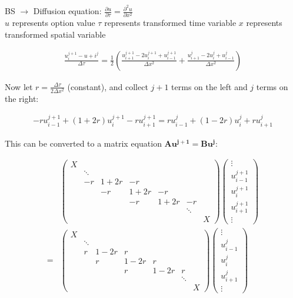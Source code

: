\documentclass[11pt]{article}
\begin{document}
BS $\to$ Diffusion equation: $\frac{\partial u}{\partial \tau}=\frac{\partial^2u}{\partial x^2}$\\
$u$ represents option value
$\tau$ represents transformed time variable
$x$ represents transformed spatial variable

\begin{align*}
    \frac{u_i^{j+1}-u+i^j}{\Delta \tau}=\frac{1}{2}\left(\frac{u_{i+1}^{j+1}-2u_i^{j+1}+u_{i-1}^{j+1}}{\Delta x^2}+\frac{u_{i+1}^{j}-2u_i^{j}+u_{i-1}^{j}}{\Delta x^2}\right)
\end{align*}

Now let $r=\frac{\Delta\tau}{2\Delta x^2}$ (constant), and collect $j+1$ terms on the left and $j$ terms on the right:

\begin{align*}
    -ru_{i-1}^{j+1}+(1+2r)u_i^{j+1}-ru_{i+1}^{j+1}=ru_{i-1}^j+(1-2r)u_i^j+ru_{i+1}^j
\end{align*}

This can be converted to a matrix equation $\mathbf{Au^{j+1}=Bu^j}$:

\begin{align*}
    &\left(\begin{array}{ccccccc}
        X & & & & & &\\
        & \ddots & & & & &\\
        & -r & 1+2r & -r & & &\\
        & & -r & 1+2r & -r & &\\
        & & & -r & 1+2r & -r &\\
        & & & & & \ddots &\\
        & & & & & & X
    \end{array}\right)\left(\begin{array}{c}
        \vdots \\
        u_{i-1}^{j+1}\\
        u_{i}^{j+1}\\
        u_{i+1}^{j+1}\\
        \vdots
    \end{array}\right)\\
    =&
    \left(\begin{array}{ccccccc}
        X & & & & & &  \\
        & \ddots & & & & & \\
        & r & 1-2r & r & & &\\
        & & r & 1-2r & r & &\\
        & & & r & 1-2r & r & \\
        & & & & & \ddots &\\
        & & & & & & X
    \end{array}\right)\left(\begin{array}{c}
        \vdots \\
        u_{i-1}^{j}\\
        u_{i}^{j}\\
        u_{i+1}^{j}\\
        \vdots
    \end{array}\right)
\end{align*}
\end{document}
